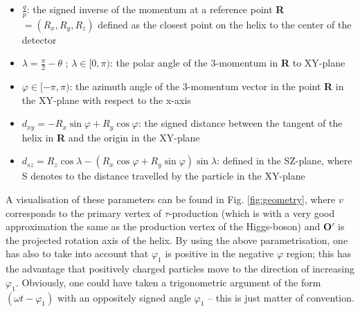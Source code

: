 \begin{itemize}
	\item $\frac{q}{p}$: the signed inverse of the momentum at a reference point \textbf{R} $=(R_x, R_y, R_z)$ defined as the closest point on the helix to the center of the detector
	\item $\lambda = \frac{\pi}{2} - \theta$ ; $\lambda \in [0, \pi)$: the polar angle of the 3-momentum in \textbf{R} to XY-plane
	\item $\varphi \in [-\pi,\pi)$: the azimuth angle of the 3-momentum vector in the point \textbf{R} in the XY-plane with respect to the x-axis
	\item $d_{xy} = -R_x \sin\varphi + R_y \cos\varphi$: the signed distance between the tangent of the helix in \textbf{R} and the origin in the XY-plane
	\item $d_{sz} = R_z\cos\lambda - (R_x\cos\varphi+R_y\sin\varphi)\sin\lambda$: defined in the SZ-plane, where S denotes to the distance travelled by the particle in the XY-plane
\end{itemize}
A visualisation of these parameters can be found in Fig. \ref{fig:geometry}, where $v$ corresponds to the primary vertex of $\tau$-production (which is with a very good approximation the same as the production vertex of the Higgs-boson) and $\boldsymbol{O'}$ is the projected rotation axis of the helix. By using the above parametrisation, one has also to take into account that $\varphi_1$ is positive in the negative $\varphi$ region; this has the advantage that positively charged particles move to the direction of increasing $\varphi_1$. Obviously, one could have taken a trigonometric argument of the form $(\omega t-\varphi_1)$ with an oppositely signed angle $\varphi_1$ -- this is just matter of convention.
